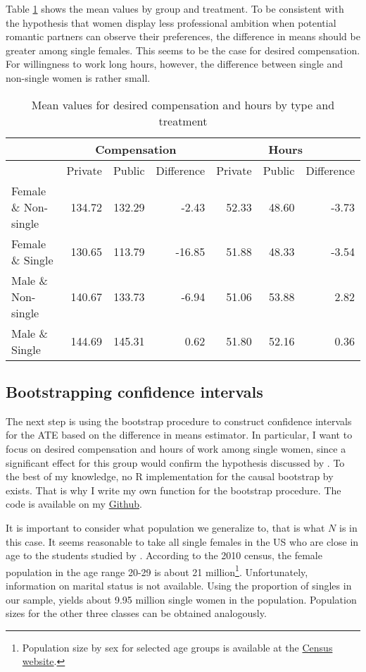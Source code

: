 \documentclass[aodsor,preprint]{imsart}
\numberwithin{equation}{section}
\theoremstyle{plain}
\begin{document}
Table \ref{mean values} shows the mean values by group and treatment. To be consistent with the hypothesis that women display less professional ambition when potential romantic partners can observe their preferences, the difference in means should be greater among single females. This seems to be the case for desired compensation. For willingness to work long hours, however, the difference between single and non-single women is rather small. 

\begin{table}[!h]
	\centering
	\caption{Mean values for desired compensation and hours by type and treatment}
	\label{mean values}
	\begin{tabular}{l|r|r|r|r|r|r}
		\hline
		& \multicolumn{3}{c|}{Compensation} & \multicolumn{3}{|c}{Hours} \\
		\hline
		& Private & Public & Difference & Private & Public & Difference \\
		\hline
		Female \& Non-single & 134.72 & 132.29 & -2.43 & 52.33 & 48.60 & -3.73\\
		Female \& Single & 130.65 & 113.79 & -16.85 & 51.88 & 48.33 & -3.54\\
		Male \& Non-single & 140.67 & 133.73 & -6.94 & 51.06 & 53.88 & 2.82\\
		Male \& Single & 144.69 & 145.31 & 0.62 & 51.80 & 52.16 & 0.36\\
		\hline
	\end{tabular}
\end{table}


\subsection{Bootstrapping confidence intervals}

The next step is using the bootstrap procedure to construct confidence intervals for the ATE based on the difference in means estimator. In particular, I want to focus on desired compensation and hours of work among single women, since a significant effect for this group would confirm the hypothesis discussed by \cite{Bursztyn_2017}. To the best of my knowledge, no R implementation for the causal bootstrap by \cite{Imbens_2021} exists. That is why I write my own function for the bootstrap procedure. The code is available on my \href{https://github.com/gregorsteiner/CausalBootstrap}{Github}.

It is important to consider what population we generalize to, that is what $N$ is in this case. It seems reasonable to take all single females in the US who are close in age to the students studied by \cite{Bursztyn_2017}. According to the 2010 census, the female population in the age range 20-29 is about 21 million\footnote{Population size by sex for selected age groups is available at the \href{https://www.census.gov/data/tables/time-series/demo/popest/2010s-national-detail.html}{Census website}.}. Unfortunately, information on marital status is not available. Using the proportion of singles in our sample, yields about 9.95 million single women in the population. Population sizes for the other three classes can be obtained analogously.
\end{document}
